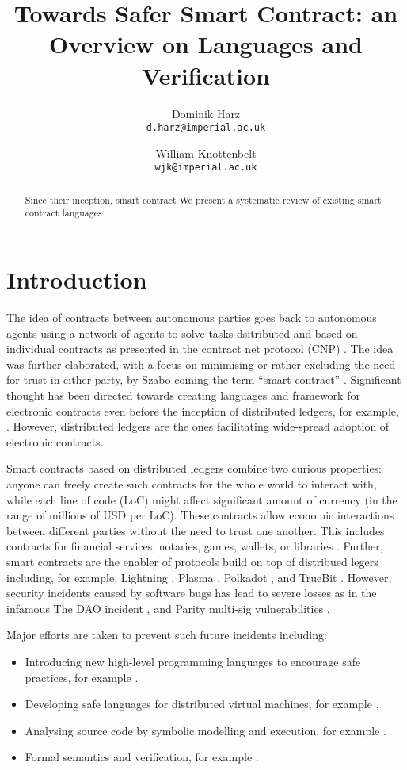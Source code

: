 \documentclass{article}
\title{Towards Safer Smart Contract: an Overview on Languages and Verification}
\date{}
\author{
Dominik Harz\\ \texttt{d.harz@imperial.ac.uk} \and
William Knottenbelt\\ \texttt{wjk@imperial.ac.uk}
}
\begin{document}
\maketitle

\begin{abstract}
Since their inception, smart contract
We present a systematic review of existing smart contract languages
\end{abstract}

\section{Introduction}
The idea of contracts between autonomous parties goes back to autonomous agents using a network of agents to solve tasks dsitributed and based on individual contracts as presented in the contract net protocol (CNP) \cite{Smith1980}.
The idea was further elaborated, with a focus on minimising or rather excluding the need for trust in either party, by Szabo coining the term ``smart contract'' \cite{Szabo1997}.
Significant thought has been directed towards creating languages and framework for electronic contracts even before the inception of distributed ledgers, for example, \cite{Andersen2006,Kyas2008,Xu2004}.
However, distributed ledgers are the ones facilitating wide-spread adoption of electronic contracts.


Smart contracts based on distributed ledgers combine two curious properties: anyone can freely create such contracts for the whole world to interact with, while each line of code (LoC) might affect significant amount of currency (in the range of millions of USD per LoC).
These contracts allow economic interactions between different parties without the need to trust one another.
This includes contracts for financial services, notaries, games, wallets, or libraries \cite{Bartoletti2017}.
Further, smart contracts are the enabler of protocols build on top of distribued legers including, for example, Lightning \cite{Poon2016}, Plasma \cite{Poon2017}, Polkadot \cite{Wood2017}, and TrueBit \cite{Teutsch2017}.
However, security incidents caused by software bugs has lead to severe losses as in the infamous The DAO incident \cite{Daian2016}, and Parity multi-sig vulnerabilities \cite{Breidenbach2017Parity,ParityTech2017}. 


Major efforts are taken to prevent such future incidents including:
\begin{itemize}
\item Introducing new high-level programming languages to encourage safe practices, for example  \cite{Hirai2018Bamboo,Ethereum2018Vyper,Schrans2018}.
\item Developing safe languages for distributed virtual machines, for example \cite{Sergey2018,DynamicLedgerSolutions2017,Popejoy2017,Kasampalis2018}.
\item Analysing source code by symbolic modelling and execution, for example \cite{Luu2016,Tsankov2017,Kalra2018,Albert2018}.
\item Formal semantics and verification, for example \cite{Bhargavan2016,Hildenbrandt2017,Hirai2017}.
\end{itemize}
\end{document}
